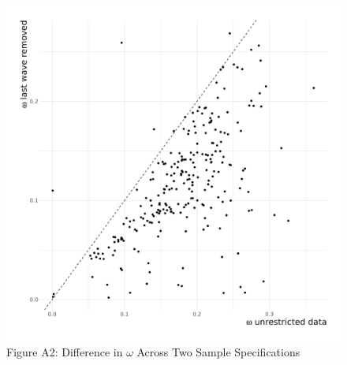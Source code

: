 \documentclass[
  12pt,
]{article}
\begin{document}
\begin{figure}[htp]
\begin{center}
\caption*{Figure A2: Difference in $\omega$ Across Two Sample Specifications} 

\includegraphics{../figures/figure_A2.png}

\end{center}
\end{figure}
\end{document}
